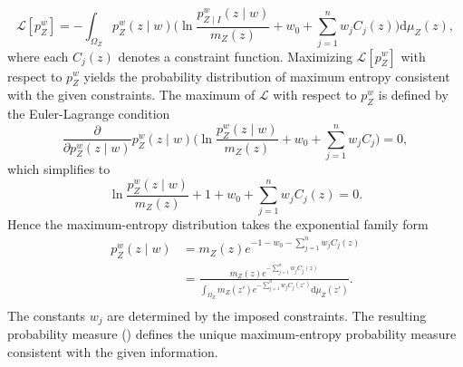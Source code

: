 \begin{equation}
	\mathcal{L}[p_{Z}^w] = - \int_{\Omega_Z} 
	p_{Z}^w(z \mid w) \Bigg(
	\ln \frac{p_{Z\mid I}^w(z \mid w)}{m_Z(z)}
	+ w_0 + \sum_{j=1}^n w_j C_j(z)
	\Bigg) \mathrm{d}\mu_Z(z),
\end{equation}
where each $C_j(z)$ denotes a constraint function. Maximizing $\mathcal{L}[p_{Z}^w]$ with respect to $p_{Z}^w$ yields the probability distribution of maximum entropy consistent with the given constraints. The maximum of $\mathcal{L}$ with respect to $p_{Z}^w$ is defined by the Euler-Lagrange condition
\begin{equation}
	\frac{\partial}{\partial p_{Z}^w(z \mid w)} p_{Z}^w(z \mid w)\Big(\ln \frac{p_{Z}^w(z \mid w)}{m_Z(z)} + w_0 + \sum_{j=1}^n w_j C_j\Big) = 0,
\end{equation}
which simplifies to
\begin{equation}
	\ln \frac{p_{Z}^w(z \mid w)}{m_Z(z)} + 1 + w_0 + \sum_{j=1}^n w_j C_j(z) = 0.
\end{equation}
Hence the maximum-entropy distribution takes the exponential family form
\begin{equation}
	\begin{split}
		p_{Z}^w(z \mid w)
		&= m_Z(z) e^{-1 - w_0 - \sum_{j=1}^n w_j C_j(z)} \\
		&= \frac{m_Z(z) e^{-\sum_{j=1}^n w_j C_j(z)}}{
			\int_{\Omega_Z} m_Z(z') e^{-\sum_{j=1}^n w_j C_j(z')} \mathrm{d}\mu_Z(z')}.\\
	\end{split}
\end{equation}
The constants $w_j$ are determined by the imposed constraints. The resulting probability measure () defines the unique maximum-entropy probability measure consistent with the given information.

